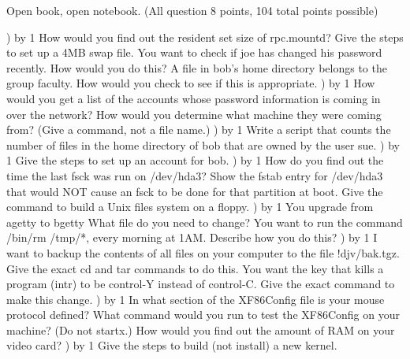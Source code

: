 
\parindent=0in
\nopagenumbers
\newcount\quesno
{}
\def\ques{\number\quesno) \advance\quesno by 1}
\def\aspace{\vskip 1.5in}

Open book, open notebook. (All question 8 points, 104 total points possible)

\ques
How would you find out the resident set size of {\ltt{}rpc.mountd}?
\vskip 0.5in
Give the steps to set up a 4MB swap file.
\vskip 1.5in
You want to check if {\ltt{}joe} has changed his password recently.
How would you do this?
\vskip 1.2in
A file in bob's home directory belongs to the group {\ltt{}faculty}.
How would you check to see if this is appropriate.
\vskip 0.8in
\ques
How would you get a list of the accounts whose password information
is coming in over the network?
\vskip 0.5in
How would you determine what machine they were coming from?
(Give a command, not a file name.)
\vskip 0.5in
\ques
Write a script that counts the number of files in
the home directory of {\ltt{}bob} that are owned by the user
{\ltt{}sue}.
\vfill\eject
\ques
Give the steps to set up an account for {\ltt{}bob}.
\vskip 2.0in
\ques
How do you find out the time the last {\ltt{}fsck} was run on {\ltt{}/dev/hda3}?
\vskip 1.0in
Show the {\ltt{}fstab} entry for {\ltt{}/dev/hda3} that would NOT cause
an {\ltt{}fsck} to be done for that partition at boot.
\vskip 0.5in
Give the command to build a Unix files system on a floppy.
\vskip 0.5in
\ques
You upgrade from {\ltt{}agetty} to {\ltt{}bgetty}
What file do you need to change?
\vskip 0.5in
You want to run the command {\ltt{}/bin/rm /tmp/*},
every morning at 1AM.
Describe how you do this?
\vfill\eject
\ques
I want to backup the contents of all files on your computer
to the file {\ltt{}!djv/bak.tgz}.
Give the exact {\ltt{}cd} and {\ltt{}tar} commands to do this.
\vskip 1.0in
You want the key that kills a program ({\ltt{}intr}) to
be control-Y instead of control-C.
Give the exact command to make this change.
\vskip 0.5in
\ques
In what section of the {\ltt{}XF86Config} file is
your mouse protocol defined?
\vskip 0.5in
What command would you run to test the {\ltt{}XF86Config} on your machine?
(Do not {\ltt{}startx}.)
\vskip 0.5in
How would you find out the amount of RAM on your video card?
\vskip 0.7in
\ques
Give the steps to build (not install) a new kernel.
\vskip 1.8in
